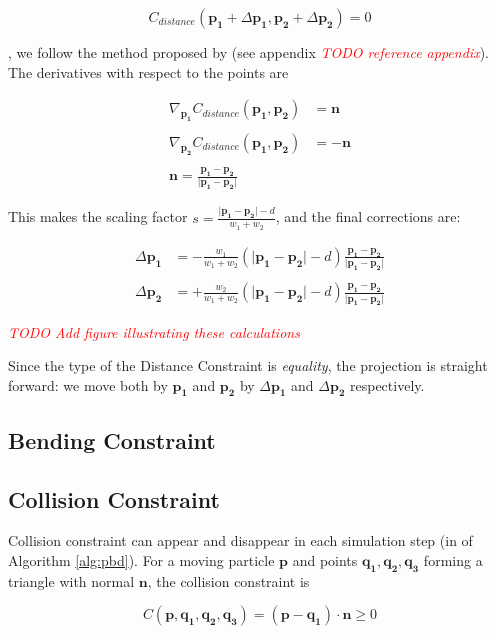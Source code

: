 \documentclass[sigplan,screen,nonacm]{acmart}
\newcommand\TODO[1]{\textcolor{red}{\emph{TODO #1}}}
\renewcommand{\b}{\boldsymbol}
\begin{document}
$$
C_{distance}(\b{p_1}+\Delta \b{p_1}, \b{p_2}+\Delta \b{p_2}) = 0
$$

, we follow the method proposed by \citet{MullerPBD} (see appendix \TODO{reference
appendix}). The derivatives with respect to the points are 

\begin{align*}
    \nabla_{\b{p_1}} C_{distance}(\b{p_1}, \b{p_2}) &= \b{n} \\\\
    \nabla_{\b{p_2}} C_{distance}(\b{p_1}, \b{p_2}) &= -\b{n} \\\\
    \b{n} = \frac{\b{p_1}-\b{p_2}}{\lvert \b{p_1}-\b{p_2} \rvert}
\end{align*}

This makes the scaling factor 
$s = \frac{\lvert \b{p_1} - \b{p_2}\rvert - d}{w_1 + w_2}$, and the final corrections
are:

\begin{align*}
    \Delta \b{p_1} &= - \frac{w_1}{w_1 + w_2}
    (\lvert \b{p_1} - \b{p_2} \rvert - d) 
    \frac{\b{p_1} - \b{p_2}}{\lvert \b{p_1} - \b{p_2} \rvert} 
    \\\\
    \Delta \b{p_2} &= + \frac{w_2}{w_1 + w_2}
    (\lvert \b{p_1} - \b{p_2} \rvert - d) 
    \frac{\b{p_1} - \b{p_2}}{\lvert \b{p_1} - \b{p_2} \rvert}
\end{align*}

\TODO{Add figure illustrating these calculations}

Since the type of the Distance Constraint is \emph{equality}, the projection is
straight forward: we move both by $\b{p_1}$ and $\b{p_2}$ by $\Delta \b{p_1}$ and
$\Delta \b{p_2}$ respectively.

\subsection{Bending Constraint}


\subsection{Collision Constraint}
Collision constraint can appear and disappear in each simulation step
(in  of Algorithm \ref{alg:pbd}). For a moving particle $\b{p}$
and points $\b{q_1}, \b{q_2}, \b{q_3}$ forming a triangle with normal $\b{n}$,
the collision constraint is

$$
C(\b{p}, \b{q_1}, \b{q_2}, \b{q_3}) = (\b{p}-\b{q_1})\cdot \b{n} \geq 0
$$
\end{document}
